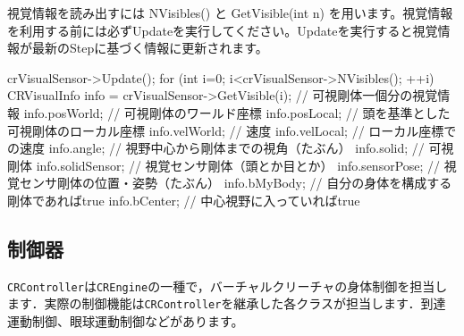 \KLUDGE 視覚情報を読み出すには NVisibles() \KLUDGE と GetVisible(int n) \KLUDGE を用います。視覚情報を利用する前には必ずUpdate\KLUDGE を実行してください。Update\KLUDGE を実行すると視覚情報が最新のStep\KLUDGE に基づく情報に更新されます。
\begin{sourcecode}
crVisualSensor->Update();
for (int i=0; i<crVisualSensor->NVisibles(); ++i) {
	CRVisualInfo info = crVisualSensor->GetVisible(i);
	// 可視剛体一個分の視覚情報
	info.posWorld;    // 可視剛体のワールド座標
	info.posLocal;    // 頭を基準とした可視剛体のローカル座標
	info.velWorld;    // 速度
	info.velLocal;    // ローカル座標での速度
	info.angle;       // 視野中心から剛体までの視角（たぶん）
	info.solid;       // 可視剛体
	info.solidSensor; // 視覚センサ剛体（頭とか目とか）
	info.sensorPose;  // 視覚センサ剛体の位置・姿勢（たぶん）
	info.bMyBody;     // 自分の身体を構成する剛体であればtrue
	info.bCenter;     // 中心視野に入っていればtrue
}
\end{sourcecode}


\subsection{\KLUDGE 制御器}

\texttt{CRController}\KLUDGE は\texttt{CREngine}\KLUDGE の一種で，バーチャルクリーチャの身体制御を担当します．実際の制御機能は\texttt{CRController}\KLUDGE を継承した各クラスが担当します．到達運動制御、眼球運動制御などがあります。

